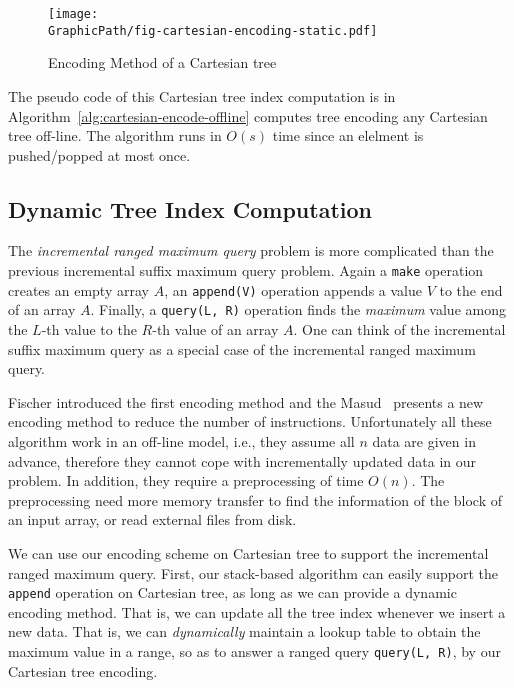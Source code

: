 \begin{figure}[!thb]
  \centering
  \texttt{[image: \\GraphicPath/fig-cartesian-encoding-static.pdf]}
  \label{fig:fig-cartesian-encoding-static}
  \caption{Encoding Method of a Cartesian tree}
\end{figure}

The pseudo code of this Cartesian tree index computation is in
Algorithm~\ref{alg:cartesian-encode-offline} computes tree encoding
any Cartesian tree off-line.  The algorithm runs in $O(s)$ time since
an elelment is pushed/popped at most once.



\subsection{Dynamic Tree Index Computation}


The {\em incremental ranged maximum query} problem is more complicated
than the previous incremental suffix maximum query problem.  Again a
{\tt make} operation creates an empty array $A$, an {\tt append(V)}
operation appends a value $V$ to the end of an array $A$.  Finally, a
{\tt query(L, R)} operation finds the {\em maximum} value among the
$L$-th value to the $R$-th value of an array $A$.  One can think of
the incremental suffix maximum query as a special case of the
incremental ranged maximum query.

Fischer introduced the first encoding method and the
Masud~\cite{Hasan2010CacheOA} presents a new encoding method to reduce
the number of instructions.  Unfortunately all these algorithm work in
an off-line model, i.e., they assume all $n$ data are given in
advance, therefore they cannot cope with incrementally updated data in
our problem.  In addition, they require a preprocessing of time
$O(n)$.  The preprocessing need more memory transfer to find the
information of the block of an input array, or read external files
from disk.


We can use our encoding scheme on Cartesian tree to support the
incremental ranged maximum query.  First, our stack-based algorithm
can easily support the {\tt append} operation on Cartesian tree, as
long as we can provide a dynamic encoding method.  That is, we can
update all the tree index whenever we insert a new data.  That is, we
can {\em dynamically} maintain a lookup table to obtain the maximum
value in a range, so as to answer a ranged query {\tt query(L, R)},
by our Cartesian tree encoding.  

